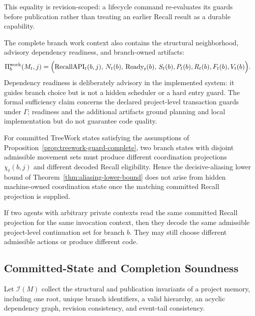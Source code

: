 This equality is revision-scoped: a lifecycle command re-evaluates its guards
before publication rather than treating an earlier Recall result as a durable
capability.

The complete branch work context also contains the structural neighborhood,
advisory dependency readiness, and branch-owned artifacts:
\begin{equation}
\Pi_b^{\mathrm{work}}(M_t,j)
=
\Bigl(
  \operatorname{RecallAPI}_t(b,j),\,
  N_t(b),\,
  \operatorname{Ready}_t(b),\,
  S_t(b),P_t(b),R_t(b),F_t(b),V_t(b)
\Bigr).
\label{eq:work-context-projection}
\end{equation}
Dependency readiness is deliberately advisory in the implemented system: it
guides branch choice but is not a hidden scheduler or a hard entry guard.  The
formal sufficiency claim concerns the declared project-level transaction guards
under $\Gamma$; readiness and the additional artifacts ground planning and
local implementation but do not guarantee code quality.

\begin{corollary}
\label{cor:no-coordination-aliasing}
For committed TreeWork states satisfying the assumptions of
Proposition~\ref{prop:treework-guard-complete}, two branch states with disjoint
admissible movement sets must produce different coordination projections
$\chi_t(b,j)$ and different decoded Recall eligibility.  Hence the
decisive-aliasing lower bound of
Theorem~\ref{thm:aliasing-lower-bound} does not arise from hidden
machine-owned coordination state once the matching committed Recall projection
is supplied.
\end{corollary}

\begin{corollary}
\label{cor:handoff-agreement}
If two agents with arbitrary private contexts read the same committed
Recall projection for the same invocation context, then they decode the same
admissible project-level continuation set for branch $b$.  They may still choose
different admissible actions or produce different code.
\end{corollary}

\subsection{Committed-State and Completion Soundness}

Let $\mathcal I(M)$ collect the structural and publication invariants of a
project memory, including one root, unique branch identifiers, a valid hierarchy,
an acyclic dependency graph, revision consistency, and event-tail consistency.

